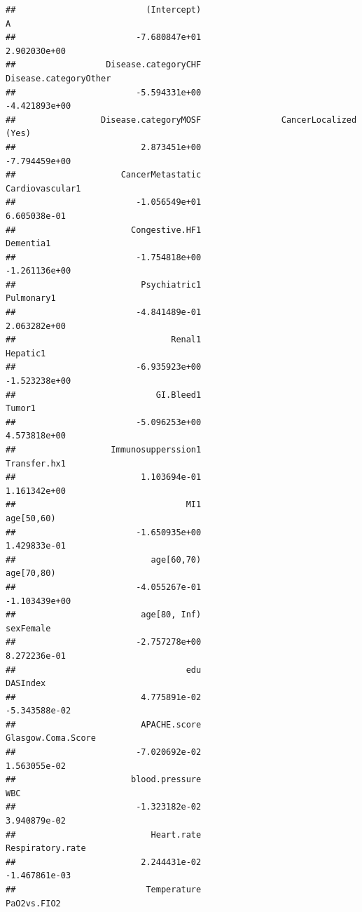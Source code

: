 \documentclass[
]{book}
\begin{document}
\begin{verbatim}
##                          (Intercept)                                    A 
##                        -7.680847e+01                         2.902030e+00 
##                  Disease.categoryCHF                Disease.categoryOther 
##                        -5.594331e+00                        -4.421893e+00 
##                 Disease.categoryMOSF                CancerLocalized (Yes) 
##                         2.873451e+00                        -7.794459e+00 
##                     CancerMetastatic                      Cardiovascular1 
##                        -1.056549e+01                         6.605038e-01 
##                       Congestive.HF1                            Dementia1 
##                        -1.754818e+00                        -1.261136e+00 
##                         Psychiatric1                           Pulmonary1 
##                        -4.841489e-01                         2.063282e+00 
##                               Renal1                             Hepatic1 
##                        -6.935923e+00                        -1.523238e+00 
##                            GI.Bleed1                               Tumor1 
##                        -5.096253e+00                         4.573818e+00 
##                   Immunosupperssion1                         Transfer.hx1 
##                         1.103694e-01                         1.161342e+00 
##                                  MI1                           age[50,60) 
##                        -1.650935e+00                         1.429833e-01 
##                           age[60,70)                           age[70,80) 
##                        -4.055267e-01                        -1.103439e+00 
##                         age[80, Inf)                            sexFemale 
##                        -2.757278e+00                         8.272236e-01 
##                                  edu                             DASIndex 
##                         4.775891e-02                        -5.343588e-02 
##                         APACHE.score                   Glasgow.Coma.Score 
##                        -7.020692e-02                         1.563055e-02 
##                       blood.pressure                                  WBC 
##                        -1.323182e-02                         3.940879e-02 
##                           Heart.rate                     Respiratory.rate 
##                         2.244431e-02                        -1.467861e-03 
##                          Temperature                          PaO2vs.FIO2 

\end{verbatim}
\end{document}
